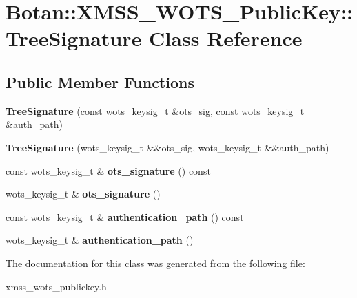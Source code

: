 \hypertarget{class_botan_1_1_x_m_s_s___w_o_t_s___public_key_1_1_tree_signature}{}\section{Botan\+:\+:X\+M\+S\+S\+\_\+\+W\+O\+T\+S\+\_\+\+Public\+Key\+:\+:Tree\+Signature Class Reference}
\label{class_botan_1_1_x_m_s_s___w_o_t_s___public_key_1_1_tree_signature}
\subsection*{Public Member Functions}
\begin{DoxyCompactItemize}
\item 
\mbox{\label{class_botan_1_1_x_m_s_s___w_o_t_s___public_key_1_1_tree_signature_a5ff1f923db177086f5a04bb7458b9ecd}} 
{\bfseries Tree\+Signature} (const wots\+\_\+keysig\+\_\+t \&ots\+\_\+sig, const wots\+\_\+keysig\+\_\+t \&auth\+\_\+path)
\item 
\mbox{\label{class_botan_1_1_x_m_s_s___w_o_t_s___public_key_1_1_tree_signature_a37c87809d1ef2ae742826f7fbc0fed4b}} 
{\bfseries Tree\+Signature} (wots\+\_\+keysig\+\_\+t \&\&ots\+\_\+sig, wots\+\_\+keysig\+\_\+t \&\&auth\+\_\+path)
\item 
\mbox{\label{class_botan_1_1_x_m_s_s___w_o_t_s___public_key_1_1_tree_signature_a11ab4a70dc8bc3d09bf6bac5682c83cf}} 
const wots\+\_\+keysig\+\_\+t \& {\bfseries ots\+\_\+signature} () const
\item 
\mbox{\label{class_botan_1_1_x_m_s_s___w_o_t_s___public_key_1_1_tree_signature_a2961306850409e885ee4fa282b3d39db}} 
wots\+\_\+keysig\+\_\+t \& {\bfseries ots\+\_\+signature} ()
\item 
\mbox{\label{class_botan_1_1_x_m_s_s___w_o_t_s___public_key_1_1_tree_signature_aee4728e8e9c74bbd4525dcd8768abb40}} 
const wots\+\_\+keysig\+\_\+t \& {\bfseries authentication\+\_\+path} () const
\item 
\mbox{\label{class_botan_1_1_x_m_s_s___w_o_t_s___public_key_1_1_tree_signature_a6ef6c3aea431f897fb57641d7c9f3c46}} 
wots\+\_\+keysig\+\_\+t \& {\bfseries authentication\+\_\+path} ()
\end{DoxyCompactItemize}


The documentation for this class was generated from the following file\+:\begin{DoxyCompactItemize}
\item 
xmss\+\_\+wots\+\_\+publickey.\+h\end{DoxyCompactItemize}
